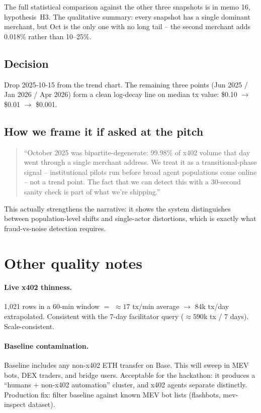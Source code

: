 \documentclass[11pt]{article}
\begin{document}
The full statistical comparison against the other three snapshots is in memo
16, hypothesis~H3. The qualitative summary: every snapshot has a single
dominant merchant, but Oct is the only one with no long tail -- the second
merchant adds 0.018\% rather than 10--25\%.

\subsection*{Decision}

Drop 2025-10-15 from the trend chart. The remaining three points
(Jun 2025 / Jan 2026 / Apr 2026) form a clean log-decay line on median tx
value: \$0.10 $\to$ \$0.01 $\to$ \$0.001.

\subsection*{How we frame it if asked at the pitch}

\begin{quote}
``October 2025 was bipartite-degenerate: 99.98\% of x402 volume that day
went through a single merchant address. We treat it as a transitional-phase
signal -- institutional pilots run before broad agent populations come
online -- not a trend point. The fact that we can detect this with a
30-second sanity check is part of what we're shipping.''
\end{quote}

This actually strengthens the narrative: it shows the system distinguishes
between population-level shifts and single-actor distortions, which is
exactly what fraud-vs-noise detection requires.

\section{Other quality notes}

\paragraph{Live x402 thinness.}
1{,}021 rows in a 60-min window $=$ $\approx 17$ tx/min average $\to$ 84k tx/day
extrapolated. Consistent with the 7-day facilitator query
($\approx 590$k tx / 7 days). Scale-consistent.

\paragraph{Baseline contamination.}
Baseline includes any non-x402 ETH transfer on Base. This will sweep in MEV
bots, DEX traders, and bridge users. Acceptable for the hackathon: it
produces a ``humans + non-x402 automation'' cluster, and x402 agents separate
distinctly. Production fix: filter baseline against known MEV bot lists
(flashbots, mev-inspect dataset).
\end{document}
